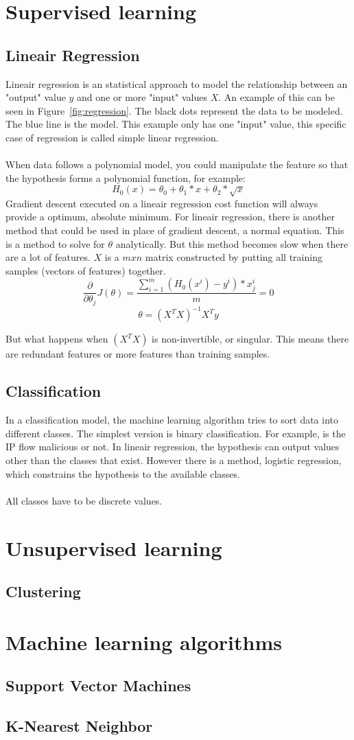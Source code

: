 \section{Supervised learning}
\subsection{Lineair Regression}
Lineair regression is an statistical approach to model the relationship between an "output" value $y$ and one or more "input" values $X$. An example of this can be seen in Figure~\ref{fig:regression}. The black dots represent the data to be modeled. The blue line is the model. This example only has one "input" value, this specific case of regression is called simple linear regression. \\
\\
When data follows a polynomial model, you could manipulate the feature so that the hypothesis forms a polynomial function, for example:
$$H_0(x) = \theta_0 + \theta_1 * x + \theta_2 * \sqrt{x}$$
Gradient descent executed on a lineair regression cost function will always provide a optimum, absolute minimum. For lineair regression, there is another method that could be used in place of gradient descent, a normal equation. This is a method to solve for $\theta$ analytically. But this method becomes slow when there are a lot of features. $X$ is a $m x n$ matrix constructed by putting all training samples (vectors of features) together. 
 $$\dfrac{\partial}{\partial \theta_j}J(\theta) =  \dfrac{\sum\limits_{i=1}^m(H_0(x^i) - y^i) * x_j^i}{m} = 0$$
  $$\theta =  (X^TX)^{-1}X^Ty$$
  
But what happens when $(X^TX)$ is non-invertible, or singular. This means there are redundant features or more features than training samples. 

\subsection{Classification}
In a classification model, the machine learning algorithm tries to sort data into different classes. The simplest version is binary classification. For example, is the IP flow malicious or not. In lineair regression, the hypothesis can output values other than the classes that exist. However there is a method, logistic regression, which constrains the hypothesis to the available classes.\\
\\
All classes have to be discrete values.

\section{Unsupervised learning}
\subsection{Clustering}

\section{Machine learning algorithms}

\subsection{Support Vector Machines}

\subsection{K-Nearest Neighbor}